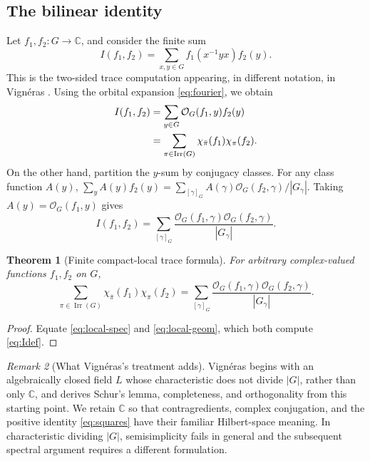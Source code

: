 \documentclass[12pt]{article}
\newtheorem{theorem}{Theorem}[section]
\theoremstyle{remark}
\newtheorem{remark}[theorem]{Remark}
\newcommand{\C}{\mathbb C}
\newcommand{\Irr}{\operatorname{Irr}}
\newcommand{\Orb}{\mathcal O}
\begin{document}
\subsection{The bilinear identity}
Let $f_1,f_2:G\to\C$, and consider the finite sum
\begin{equation}\label{eq:Idef}
 I(f_1,f_2)=\sum_{x,y\in G}
          f_1(x^{-1}yx)f_2(y).
\end{equation}
This is the two-sided trace computation appearing, in different
notation, in Vign\'eras \cite[\S1.1]{Vigneras1991}.
Using the orbital expansion \eqref{eq:fourier}, we obtain
\begin{align}
 I(f_1,f_2)
 &=\sum_{y\in G}\Orb_G(f_1,y)f_2(y)\notag\\
 &=\sum_{\pi\in\Irr(G)}
     \chi_{\bar\pi}(f_1)\chi_\pi(f_2).
 \label{eq:local-spec}
\end{align}
On the other hand, partition the $y$-sum by conjugacy classes.  For
any class function $A(y)$,
$\sum_y A(y)f_2(y)=
\sum_{[\gamma]_G}A(\gamma)\Orb_G(f_2,\gamma)/|G_\gamma|$.
Taking $A(y)=\Orb_G(f_1,y)$ gives
\begin{equation}\label{eq:local-geom}
 I(f_1,f_2)
 =\sum_{[\gamma]_G}\frac{\Orb_G(f_1,\gamma)
                               \Orb_G(f_2,\gamma)}{|G_\gamma|}.
\end{equation}
\begin{theorem}[Finite compact-local trace formula]\label{thm:local}
For arbitrary complex-valued functions $f_1,f_2$ on $G$,
\begin{equation}\label{eq:localboxed}
 \boxed{\displaystyle
 \sum_{\pi\in\Irr(G)}
  \chi_{\bar\pi}(f_1)\chi_\pi(f_2)
 =\sum_{[\gamma]_G}\frac{\Orb_G(f_1,\gamma)
                             \Orb_G(f_2,\gamma)}{|G_\gamma|}.}
\end{equation}
\end{theorem}
\begin{proof}
Equate \eqref{eq:local-spec} and \eqref{eq:local-geom},
which both compute \eqref{eq:Idef}.
\end{proof}
\begin{remark}[What Vign\'eras's treatment adds]
Vign\'eras \cite[\S1]{Vigneras1991} begins with an algebraically
closed field $L$ whose characteristic does not divide $|G|$, rather than
only $\C$, and derives Schur's lemma, completeness, and
orthogonality from this starting point. We retain $\C$
so that contragredients, complex conjugation, and the positive
identity \eqref{eq:squares} have their familiar Hilbert-space
meaning. In characteristic dividing $|G|$, semisimplicity fails
in general and the subsequent spectral argument requires a
different formulation.
\end{remark}
\end{document}
